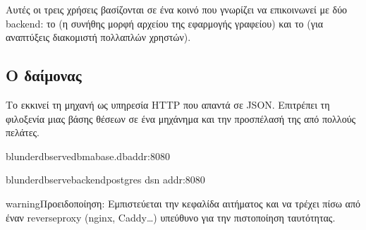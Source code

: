 \documentclass[letterpaper,10pt,greek]{sphinxmanual}
\begin{document}
\sphinxAtStartPar
Αυτές οι τρεις χρήσεις βασίζονται σε ένα κοινό  που γνωρίζει να επικοινωνεί με δύο backend: το  (η συνήθης μορφή αρχείου  της εφαρμογής γραφείου) και το  (για αναπτύξεις διακομιστή πολλαπλών χρηστών).


\subsection{Ο δαίμονας }
\label{\detokenize{mode_headless:le-demon-serve}}\label{\detokenize{mode_headless:headless-serve}}
\sphinxAtStartPar
Το  εκκινεί τη μηχανή ως υπηρεσία HTTP που απαντά σε JSON. Επιτρέπει τη φιλοξενία μιας βάσης θέσεων σε ένα μηχάνημα και την προσπέλασή της από πολλούς πελάτες.

\begin{sphinxVerbatim}[commandchars=\\\{\}]
blunderdbserve\PYGZhy{}\PYGZhy{}dbma\PYGZus{}base.db\PYGZhy{}\PYGZhy{}addr:8080

blunderdbserve\PYGZhy{}\PYGZhy{}backendpostgres
\PYGZhy{}\PYGZhy{}dsn
\PYGZhy{}\PYGZhy{}addr:8080
\end{sphinxVerbatim}

\begin{sphinxadmonition}{warning}{Προειδοποίηση:}
\sphinxAtStartPar
{} Εμπιστεύεται την κεφαλίδα αιτήματος  και  να τρέχει πίσω από έναν reverse\sphinxhyphen{}proxy (nginx, Caddy…) υπεύθυνο για την πιστοποίηση ταυτότητας. 
\end{sphinxadmonition}

\sphinxAtStartPar
{}
\end{document}
